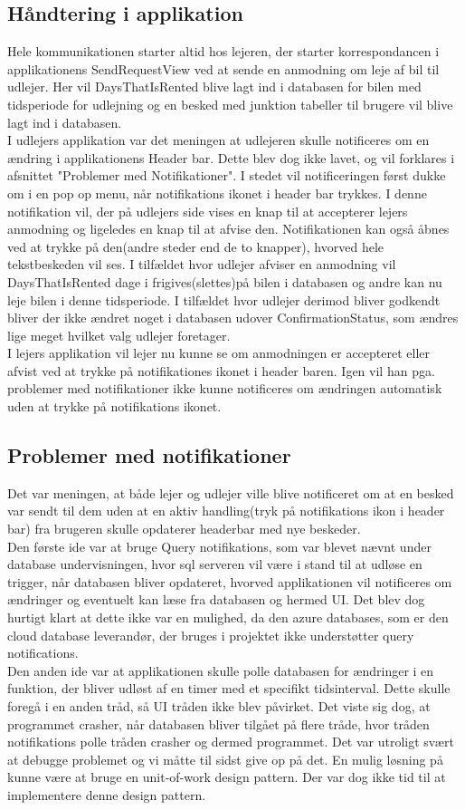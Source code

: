 \documentclass[SoftwareDesign/SoftwareDesign_main.tex]{subfiles}
\begin{document}
\subsection{Håndtering i applikation}
Hele kommunikationen starter altid hos lejeren, der starter korrespondancen i applikationens SendRequestView ved at sende en anmodning om leje af bil til udlejer. Her vil DaysThatIsRented blive lagt ind i databasen for bilen med tidsperiode for udlejning og en besked med junktion tabeller til brugere vil blive lagt ind i databasen.
\\
I udlejers applikation var det meningen at udlejeren skulle notificeres om en ændring i applikationens Header bar. Dette blev dog ikke lavet, og vil forklares i afsnittet "Problemer med Notifikationer". I stedet vil notificeringen først dukke om i en pop op menu, når notifikations ikonet i header bar trykkes. I denne notifikation vil, der på udlejers side vises en knap til at accepterer lejers anmodning og ligeledes en knap til at afvise den. Notifikationen kan også åbnes ved at trykke på den(andre steder end de to knapper), hvorved hele tekstbeskeden vil ses. I tilfældet hvor udlejer afviser en anmodning vil DaysThatIsRented dage i frigives(slettes)på bilen i databasen og andre kan nu leje bilen i denne tidsperiode. I tilfældet hvor udlejer derimod bliver godkendt bliver der ikke ændret noget i databasen udover ConfirmationStatus, som ændres lige meget hvilket valg udlejer foretager. 
\\ 
I lejers applikation vil lejer nu kunne se om anmodningen er accepteret eller afvist ved at trykke på notifikationes ikonet i header baren. Igen vil han pga. problemer med notifikationer ikke kunne notificeres om ændringen automatisk uden at trykke på notifikations ikonet.
\subsection{Problemer med notifikationer}
Det var meningen, at både lejer og udlejer ville blive notificeret om at en besked var sendt til dem uden at en aktiv handling(tryk på notifikations ikon i header bar) fra brugeren skulle opdaterer headerbar med nye beskeder.
\\
Den første ide var at bruge Query notifikations, som var blevet nævnt under database undervisningen, hvor sql serveren vil være i stand til at udløse en trigger, når databasen bliver opdateret, hvorved applikationen vil notificeres om ændringer og eventuelt kan læse fra databasen og hermed UI. Det blev dog hurtigt klart at dette ikke var en mulighed, da den azure databases, som er den cloud database leverandør, der bruges i projektet ikke understøtter query notifications. 
\\
Den anden ide var at applikationen skulle polle databasen for ændringer i en funktion, der bliver udløst af en timer med et specifikt tidsinterval. Dette skulle foregå i en anden tråd, så UI tråden ikke blev påvirket. Det viste sig dog, at programmet crasher, når databasen bliver tilgået på flere tråde, hvor tråden notifikations polle tråden crasher og dermed programmet. Det var utroligt svært at debugge problemet og vi måtte til sidst give op på det. En mulig løsning på kunne være at bruge en unit-of-work design pattern. Der var dog ikke tid til at implementere denne design pattern.
\end{document}
